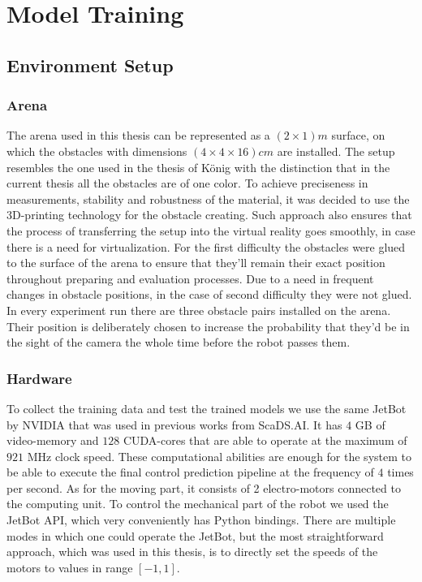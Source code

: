 \chapter{Model Training}
\label{cha:Main}

\section{Environment Setup}

\subsection{Arena}

The arena used in this thesis can be represented as a $(2 \times 1)m$ surface, on which the obstacles with dimensions $(4 \times 4 \times 16) cm$ are installed. The setup resembles the one used in the thesis of König \autocite{konig2022model} with the distinction that in the current thesis all the obstacles are of one color. To achieve preciseness in measurements, stability and robustness of the material, it was decided to use the 3D-printing technology for the obstacle creating. Such approach also ensures that the process of transferring the setup into the virtual reality goes smoothly, in case there is a need for virtualization. For the first difficulty the obstacles were glued to the surface of the arena to ensure that they'll remain their exact position throughout preparing and evaluation processes. Due to a need in frequent changes in obstacle positions, in the case of second difficulty they were not glued. In every experiment run there are three obstacle pairs installed on the arena. Their position is deliberately chosen to increase the probability that they'd be in the sight of the camera the whole time before the robot passes them.

\subsection{Hardware}

To collect the training data and test the trained models we use the same JetBot by NVIDIA that was used in previous works from ScaDS.AI. It has $4$ GB of video-memory and $128$ CUDA-cores that are able to operate at the maximum of $921$ MHz clock speed. These computational abilities are enough for the system to be able to execute the final control prediction pipeline at the frequency of $4$ times per second. As for the moving part, it consists of 2 electro-motors connected to the computing unit. To control the mechanical part of the robot we used the JetBot API, which very conveniently has Python bindings. There are multiple modes in which one could operate the JetBot, but the most straightforward approach, which was used in this thesis, is to directly set the speeds of the motors to values in range $[-1,1]$.

